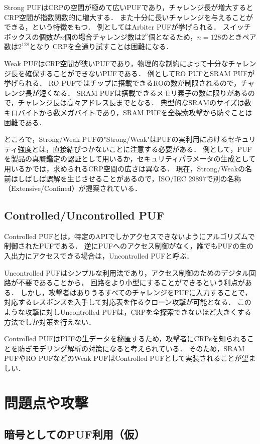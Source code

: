 \documentclass[technicalreport]{ieicej} %
\begin{document}
Strong PUFはCRPの空間が極めて広いPUFであり，チャレンジ長が増大するとCRP空間が指数関数的に増大する．
また十分に長いチャレンジを与えることができる，という特徴をもつ．
例としてはArbiter PUFが挙げられる．
スイッチボックスの個数が$n$個の場合チャレンジ数は$2^n$個となるため，$n=128$のときペア数は$2^{128}$となり
CRPを全通り試すことは困難になる．

Weak PUFはCRP空間が狭いPUFであり，物理的な制約によって十分なチャレンジ長を確保することができないPUFである．
例としてRO PUFとSRAM PUFが挙げられる．
RO PUFではチップに搭載できるROの数が制限されるので，チャレンジ長が短くなる．
SRAM PUFは搭載できるメモリ素子の数に限りがあるので，チャレンジ長は高々アドレス長までとなる．
典型的なSRAMのサイズは数キロバイトから数メガバイトであり，SRAM PUFを全探索攻撃から防ぐことは困難である．

ところで，Strong/Weak PUFの"Strong/Weak"はPUFの実利用におけるセキュリティ強度とは，直接結びつかないことに注意する必要がある．
例として，PUFを製品の真贋鑑定の認証として用いるか，セキュリティパラメータの生成として用いるかでは，求められるCRP空間の広さは異なる．
現在，Strong/Weakの名前はしばしば誤解を生じさせることがあるので，ISO/IEC 29897で別の名称（Extensive/Confined）が提案されている\cite{hori-nedo}．

\subsection{Controlled/Uncontrolled PUF}
Controlled PUFとは，特定のAPIでしかアクセスできないようにアルゴリズムで制御されたPUFである\cite{gassend-cpuf1}\cite{gassend-cpuf2}．
逆にPUFへのアクセス制御がなく，誰でもPUFの生の入出力にアクセスできる場合は，Uncontrolled PUFと呼ぶ．

Uncontrolled PUFはシンプルな利用法であり，アクセス制御のためのデジタル回路が不要であることから，
回路をより小型にすることができるという利点がある\cite{sugatake}．
しかし，攻撃者はありうるすべてのチャレンジをPUFに入力することで，対応するレスポンスを入手して対応表を作るクローン攻撃が可能となる．
このような攻撃に対しUncontrolled PUFは，CRPを全探索できないほど大きくする方法でしか対策を行えない．

Controlled PUFはPUFの生データを秘匿するため，攻撃者にCRPsを知られることを防ぎモデリング解析の対策になると考えられている．
そのため，SRAM PUFやRO PUFなどのWeak PUFはControlled PUFとして実装されることが望ましい．
\section{問題点や攻撃}
\subsection{暗号としてのPUF利用（仮）}
\end{document}
